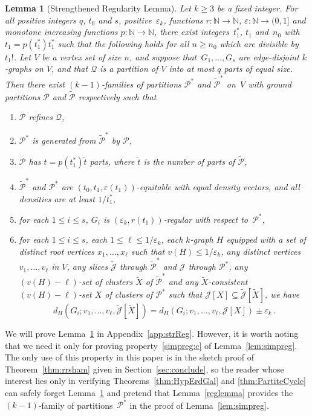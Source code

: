 \documentclass[12pt,a4paper]{amsart}
\def\itm#1{\rm ({#1})}
\def\itmit#1{\itm{\it #1\,}}
\def\abc{\itmit{\alph{*}}}
\let\eps\varepsilon
\newtheorem{lemma}[theorem] {Lemma}
\newcommand{\NATS}{\mathbb{N}}
\newcommand{\cJ}{\mathcal{J}}
\newcommand{\Part}{\mathcal{P}}
\newcommand{\Qart}{\mathcal{Q}}
\begin{document}
\begin{lemma}[Strengthened Regularity Lemma]\label{lem:strReg}
  Let $k \geq 3$ be a fixed integer. For all positive integers $q$, $t_0$ and $s$,
  positive~$\eps_k$, functions $r: \NATS \rightarrow \NATS$, $\eps: \NATS \rightarrow (0,1]$ and monotone increasing functions 
  $p:\NATS\to\NATS$, there exist integers~$t_1^*$, $t_1$
  and~$n_0$ with $t_1=p(t_1^*)t_1^*$ such that the following holds
  for all $n \ge n_0$ which are divisible by~$t_1!$. Let $V$ be a vertex set of size $n$, and suppose that~$G_1, \dots, G_s$ are edge-disjoint $k$-graphs on $V$, and that $\Qart$ is a
  partition of $V$ into at most $q$ parts of equal size. Then there exist
  $(k-1)$-families of partitions $\Part^*$ and $\tilde{\Part}^*$ on~$V$ with ground
  partitions $\Part$ and $\tilde{\Part}$ respectively such that
  \begin{enumerate}[label=\abc]
    \item\label{strReg:refQ} $\Part$ refines $\Qart$,
    \item\label{strReg:genP} $\Part^*$ is generated from $\tilde{\Part}^*$ by $\Part$,
   \item\label{strReg:numP} $\Part$ has
    $t=p(t_1^*)\tilde{t}$ parts, where $\tilde{t}$ is the number of parts of $\tilde{\Part}$,
    \item\label{strReg:equit} $\tilde{\Part}^*$ and $\Part^*$ are $(t_0,t_1,
    \eps(t_1))$-equitable with equal density vectors, and all
    densities are at least $1/t_1^*$,
   \item\label{strReg:regP} for each $1 \leq i \leq s$, $G_i$ is
    $(\eps_k,r(t_1))$-regular with respect to~$\Part^*$,
    \item\label{strReg:spread} for each $1\leq i\leq s$, each $1\le\ell\le
    1/\eps_k$, each $k$-graph $H$ equipped with a set of distinct root vertices
  $x_1,\ldots,x_\ell$ such that $v(H)\le 1/\eps_k$, any distinct vertices
  $v_1,\ldots,v_\ell$ in $V$, any slices $\tilde{\cJ}$ through $\tilde{\Part}^*$ and $\cJ$
  through $\Part^*$, any $(v(H)-\ell)$-set of clusters $\tilde{X}$ of $\tilde{\Part}^*$ and any 
  $\tilde{X}$-consistent $(v(H)-\ell)$-set $X$ of clusters of $\Part^*$ such that
  $\cJ[X]\subseteq\tilde{\cJ}[\tilde{X}]$, we have
  \[d_H(G_i;v_1,\ldots,v_\ell,\tilde{\cJ}[\tilde{X}])=d_H(G_i;v_1,\ldots,v_\ell,\cJ[X])\pm\eps_k\,.\]
  \end{enumerate}
\end{lemma}

We will prove Lemma~\ref{lem:strReg} in Appendix~\ref{app:strReg}. However,
it is worth noting that we need it only for proving property~\ref{simpreg:c} of
Lemma~\ref{lem:simpreg}. The only use of this property in this paper is in the sketch proof of Theorem~\ref{thm:rrsham} given in Section~\ref{sec:conclude}, so the 
reader whose interest lies only in verifying Theorems~\ref{thm:HypErdGal} and \ref{thm:PartiteCycle} can safely forget Lemma~\ref{lem:strReg} and pretend that
Lemma~\ref{reglemma} provides the $(k-1)$-family of partitions~$\Part^*$ in the proof of
Lemma~\ref{lem:simpreg}. 
\end{document}
